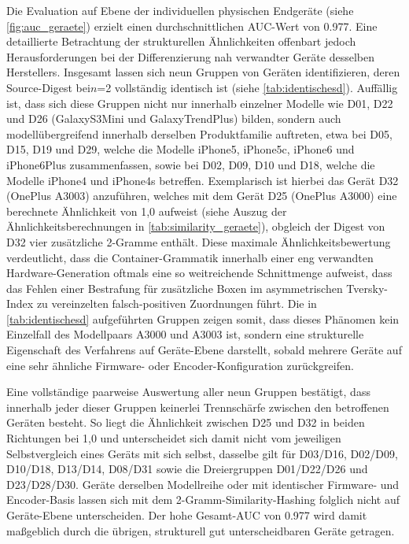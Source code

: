 Die Evaluation auf Ebene der individuellen physischen Endgeräte (siehe \cref{fig:auc_geraete}) erzielt einen durchschnittlichen AUC-Wert von 0.977. Eine detaillierte Betrachtung der strukturellen Ähnlichkeiten offenbart jedoch Herausforderungen bei der Differenzierung nah verwandter Geräte desselben Herstellers. Insgesamt lassen sich neun Gruppen von Geräten identifizieren, deren Source-Digest bei\(n\)=2 vollständig identisch ist (siehe \cref{tab:identischesd}). Auffällig ist, dass sich diese Gruppen nicht nur innerhalb einzelner Modelle wie D01, D22 und D26 (GalaxyS3Mini und GalaxyTrendPlus) bilden, sondern auch modellübergreifend innerhalb derselben Produktfamilie auftreten, etwa bei D05, D15, D19 und D29, welche die Modelle iPhone5, iPhone5c, iPhone6 und iPhone6Plus zusammenfassen, sowie bei D02, D09, D10 und D18, welche die Modelle iPhone4 und iPhone4s betreffen. Exemplarisch ist hierbei das Gerät D32 (OnePlus A3003) anzuführen, welches mit dem Gerät D25 (OnePlus A3000) eine berechnete Ähnlichkeit von 1,0 aufweist (siehe Auszug der Ähnlichkeitsberechnungen in \cref{tab:similarity_geraete}), obgleich der Digest von D32 vier zusätzliche 2-Gramme enthält. Diese maximale Ähnlichkeitsbewertung verdeutlicht, dass die Container-Grammatik innerhalb einer eng verwandten Hardware-Generation oftmals eine so weitreichende Schnittmenge aufweist, dass das Fehlen einer Bestrafung für zusätzliche Boxen im asymmetrischen Tversky-Index zu vereinzelten falsch-positiven Zuordnungen führt. Die in \cref{tab:identischesd} aufgeführten Gruppen zeigen somit, dass dieses Phänomen kein Einzelfall des Modellpaars A3000 und A3003 ist, sondern eine strukturelle Eigenschaft des Verfahrens auf Geräte-Ebene darstellt, sobald mehrere Geräte auf eine sehr ähnliche Firmware- oder Encoder-Konfiguration zurückgreifen.

Eine vollständige paarweise Auswertung aller neun Gruppen bestätigt, dass innerhalb jeder dieser Gruppen keinerlei Trennschärfe zwischen den betroffenen Geräten besteht. So liegt die Ähnlichkeit zwischen D25 und D32 in beiden Richtungen bei 1,0 und unterscheidet sich damit nicht vom jeweiligen Selbstvergleich eines Geräts mit sich selbst, dasselbe gilt für D03/D16, D02/D09, D10/D18, D13/D14, D08/D31 sowie die Dreiergruppen D01/D22/D26 und D23/D28/D30. Geräte derselben Modellreihe oder mit identischer Firmware- und Encoder-Basis lassen sich mit dem 2-Gramm-Similarity-Hashing folglich nicht auf Geräte-Ebene unterscheiden. Der hohe Gesamt-AUC von 0.977 wird damit maßgeblich durch die übrigen, strukturell gut unterscheidbaren Geräte getragen.

